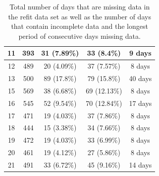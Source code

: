 \begin{table}[H]
\begin{adjustwidth*}{-3.0cm}{-3.0cm}
\begin{tabular}{ccccc}
                        11                        & 393                         & 31 (7.89\%)                  & 33 (8.4\%)                      & 9 days                  \\ \midrule
                        12                        & 489                         & 20 (4.09\%)                  & 37 (7.57\%)                     & 8 days                  \\ \midrule
                        13                        & 500                         & 89 (17.8\%)                  & 79 (15.8\%)                     & 40 days                 \\ \midrule
                        15                        & 569                         & 38 (6.68\%)                  & 69 (12.13\%)                    & 8 days                  \\ \midrule
                        16                        & 545                         & 52 (9.54\%)                  & 70 (12.84\%)                    & 17 days                 \\ \midrule
                        17                        & 471                         & 19 (4.03\%)                  & 37 (7.86\%)                     & 8 days                  \\ \midrule
                        18                        & 444                         & 15 (3.38\%)                  & 34 (7.66\%)                     & 8 days                  \\ \midrule
                        19                        & 472                         & 19 (4.03\%)                  & 33 (6.99\%)                     & 8 days                  \\ \midrule
                        20                        & 461                         & 19 (4.12\%)                  & 27 (5.86\%)                     & 8 days                  \\ \midrule
                        21                        & 491                         & 33 (6.72\%)                  & 45 (9.16\%)                     & 14 days                 \\ \bottomrule
                \end{tabular}
                \caption{Total number of days that are missing data in the \gls{refit} data set as well as the number of days that contain incomplete data and the longest period of consecutive days missing data.}
                \label{tab:REFIT-missing-data}
        \end{adjustwidth*}
\end{table}

